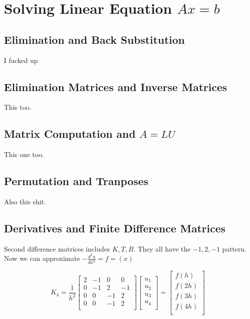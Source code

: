 \chapter{Solving Linear Equation \(Ax = b\)}
\section{Elimination and Back Substitution}
I fucked up

\section{Elimination Matrices and Inverse Matrices}
This too.

\section{Matrix Computation and \(A = LU\)}
This one too.

\section{Permutation and Tranposes}
Also this shit.

\section{Derivatives and Finite Difference Matrices}
Second difference matrices includes \(K, T, B\).
They all have the \(-1, 2, -1\) pattern.
Now we can approximate \(-\frac{d^2 u}{dx^2} = f=(x)\) 

\[
K_4 =
\frac{1}{h^2}
    \begin{bmatrix}
        2 & -1 & 0 & 0  \\
         0 & -1 & 2 & -1  \\
         0 &  0 & -1  & 2  \\
        0 & 0 & -1 & 2  \\
    \end{bmatrix}
    \begin{bmatrix}
        u_1  \\
        u_2  \\
        u_3  \\
        u_4  \\
    \end{bmatrix}
    =
    \begin{bmatrix}
        f(h)  \\
        f(2h)  \\
        f(3h)  \\
        f(4h)  \\
    \end{bmatrix}
\]

